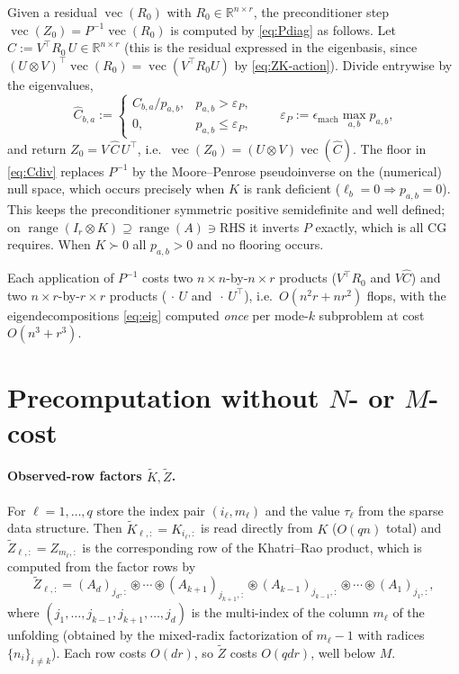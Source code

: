 \documentclass[12pt]{article}
\DeclareMathOperator{\vecop}{vec}
\DeclareMathOperator{\range}{range}
\newcommand{\bR}{\mathbb{R}}
\newcommand{\tZ}{\tilde{Z}}
\newcommand{\tK}{\tilde{K}}
\begin{document}
Given a residual $\vecop(R_0)$ with $R_0\in\bR^{n\times r}$, the
preconditioner step $\vecop(Z_0)=P^{-1}\vecop(R_0)$ is computed by
\eqref{eq:Pdiag} as follows. Let $C:=V^{\top}R_0\,U\in\bR^{n\times r}$
(this is the residual expressed in the eigenbasis, since $(U\otimes
V)^{\top}\vecop(R_0)=\vecop(V^{\top}R_0U)$ by \eqref{eq:ZK-action}).
Divide entrywise by the eigenvalues,
\begin{equation}\label{eq:Cdiv}
  \widehat C_{b,a}:=
  \begin{cases} C_{b,a}/p_{a,b}, & p_{a,b}>\varepsilon_P,\\[2pt]
                0, & p_{a,b}\le\varepsilon_P,\end{cases}
  \qquad \varepsilon_P:=\epsilon_{\mathrm{mach}}\max_{a,b}p_{a,b},
\end{equation}
and return $Z_0=V\,\widehat C\,U^{\top}$, i.e.\
$\vecop(Z_0)=(U\otimes V)\vecop(\widehat C)$. The floor in
\eqref{eq:Cdiv} replaces $P^{-1}$ by the Moore--Penrose pseudoinverse on
the (numerical) null space, which occurs precisely when $K$ is rank
deficient ($\ell_b=0\Rightarrow p_{a,b}=0$). This keeps the preconditioner
symmetric positive semidefinite and well defined; on
$\range(I_r\otimes K)\supseteq\range(A)\ni\text{RHS}$ it inverts $P$
exactly, which is all CG requires. When $K\succ0$ all $p_{a,b}>0$ and no flooring occurs.

Each application of $P^{-1}$ costs two $n\times n$-by-$n\times r$ products
($V^{\top}R_0$ and $V\widehat C$) and two $n\times r$-by-$r\times r$
products ($\,\cdot\,U$ and $\,\cdot\,U^{\top}$), i.e.\
$O(n^2r+nr^2)$ flops, with the eigendecompositions \eqref{eq:eig} computed
\emph{once} per mode-$k$ subproblem at cost $O(n^3+r^3)$.

\section{Precomputation without $N$- or $M$-cost}\label{sec:precompute}

\paragraph{Observed-row factors $\tK,\tZ$.}
For $\ell=1,\dots,q$ store the index pair $(i_\ell,m_\ell)$ and the value
$\tau_\ell$ from the sparse data structure. Then $\tK_{\ell,:}=K_{i_\ell,:}$
is read directly from $K$ ($O(qn)$ total) and $\tZ_{\ell,:}=Z_{m_\ell,:}$
is the corresponding row of the Khatri--Rao product, which is computed
from the factor rows by
\begin{equation}\label{eq:Zrow}
  \tZ_{\ell,:}=(A_d)_{j_d,:}\circledast\cdots\circledast
  (A_{k+1})_{j_{k+1},:}\circledast (A_{k-1})_{j_{k-1},:}\circledast\cdots
  \circledast (A_1)_{j_1,:},
\end{equation}
where $(j_1,\dots,j_{k-1},j_{k+1},\dots,j_d)$ is the multi-index of the
column $m_\ell$ of the unfolding (obtained by the mixed-radix
factorization of $m_\ell-1$ with radices $\{n_i\}_{i\neq k}$). Each row
costs $O(dr)$, so $\tZ$ costs $O(qdr)$, well below $M$.
\end{document}
